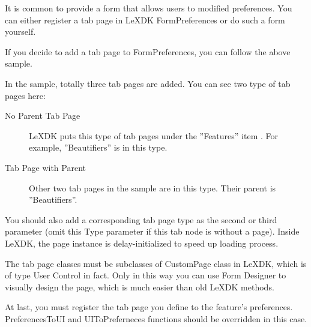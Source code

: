 It is common to provide a form that allows users to modified preferences. You 
can either register a tab page in LeXDK FormPreferences or do such a form 
yourself.

If you decide to add a tab page to FormPreferences, you can follow the above 
sample.

In the sample, totally three tab pages are added. You can see two type of tab 
pages here:

\begin{description}
  \item[No Parent Tab Page] LeXDK puts this type of tab 
pages under the ''Features'' item . For example, ''Beautifiers'' is in this 
type.
  
  \item[Tab Page with Parent] Other two tab pages in the sample are in this 
  type. Their parent is ''Beautifiers''.
\end{description}
  
You should also add a corresponding tab page type as the second or third 
parameter (omit this Type parameter if this tab node is without a page). Inside 
LeXDK, the page instance is delay-initialized to speed up loading process.

The tab page classes must be subclasses of CustomPage class in LeXDK, which is
of type User Control in fact. Only in this way you can use Form Designer to
visually design the page, which is much easier than old LeXDK methods.

At last, you must register the tab page you define to the feature's 
preferences. PreferencesToUI and UIToPreferneces functions should be 
overridden in this case. 

